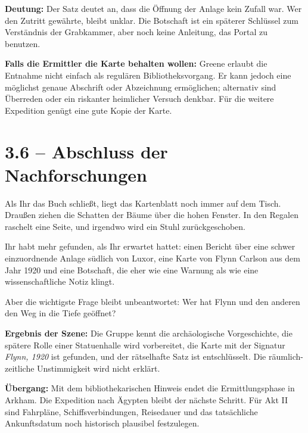 \begin{meisterinfo}
\textbf{Deutung:} Der Satz deutet an, dass die Öffnung der Anlage kein Zufall war. Wer den Zutritt gewährte, bleibt unklar. Die Botschaft ist ein späterer Schlüssel zum Verständnis der Grabkammer, aber noch keine Anleitung, das Portal zu benutzen.

\textbf{Falls die Ermittler die Karte behalten wollen:} Greene erlaubt die Entnahme nicht einfach als regulären Bibliotheksvorgang. Er kann jedoch eine möglichst genaue Abschrift oder Abzeichnung ermöglichen; alternativ sind Überreden oder ein riskanter heimlicher Versuch denkbar. Für die weitere Expedition genügt eine gute Kopie der Karte.
\end{meisterinfo}

\section{3.6 -- Abschluss der Nachforschungen}
\begin{vorlesetextalle}
Als Ihr das Buch schlie\ss{}t, liegt das Kartenblatt noch immer auf dem Tisch. Drau\ss{}en ziehen die Schatten der Bäume über die hohen Fenster. In den Regalen raschelt eine Seite, und irgendwo wird ein Stuhl zurückgeschoben.

Ihr habt mehr gefunden, als Ihr erwartet hattet: einen Bericht über eine schwer einzuordnende Anlage südlich von Luxor, eine Karte von Flynn Carlson aus dem Jahr 1920 und eine Botschaft, die eher wie eine Warnung als wie eine wissenschaftliche Notiz klingt.

Aber die wichtigste Frage bleibt unbeantwortet: Wer hat Flynn und den anderen den Weg in die Tiefe geöffnet?
\end{vorlesetextalle}
\begin{meisterinfo}
\textbf{Ergebnis der Szene:} Die Gruppe kennt die archäologische Vorgeschichte, die spätere Rolle einer Statuenhalle wird vorbereitet, die Karte mit der Signatur \emph{Flynn, 1920} ist gefunden, und der rätselhafte Satz ist entschlüsselt. Die räumlich-zeitliche Unstimmigkeit wird nicht erklärt.

\textbf{Übergang:} Mit dem bibliothekarischen Hinweis endet die Ermittlungsphase in Arkham. Die Expedition nach Ägypten bleibt der nächste Schritt. Für Akt II sind Fahrpläne, Schiffsverbindungen, Reisedauer und das tatsächliche Ankunftsdatum noch historisch plausibel festzulegen.
\end{meisterinfo}

